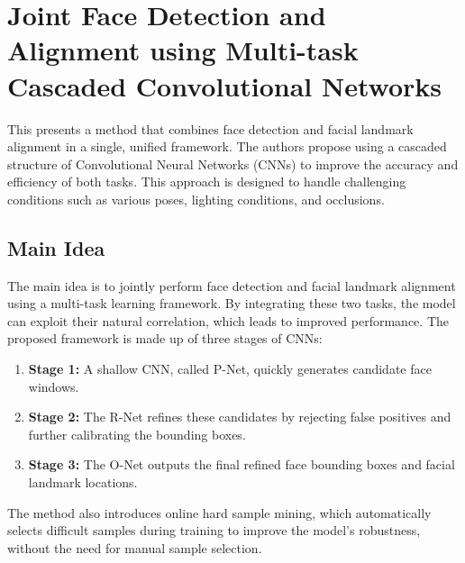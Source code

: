 \documentclass{report}
\begin{document}
	
	
	
	
	
	
	
	
	
	
	
	
	\chapter{Joint Face Detection and Alignment using Multi-task Cascaded Convolutional Networks \cite{Zhang_2016}}
	This presents a method that combines face detection and facial landmark alignment in a single, unified framework. The authors propose using a cascaded structure of Convolutional Neural Networks (CNNs) to improve the accuracy and efficiency of both tasks. This approach is designed to handle challenging conditions such as various poses, lighting conditions, and occlusions.
	
	
	\section{Main Idea}
	The main idea is to jointly perform face detection and facial landmark alignment using a multi-task learning framework. By integrating these two tasks, the model can exploit their natural correlation, which leads to improved performance. The proposed framework is made up of three stages of CNNs:
	\begin{enumerate}
		\item 
		\textbf{Stage 1:} A shallow CNN, called P-Net, quickly generates candidate face windows.
		
		\item 
		\textbf{Stage 2:} The R-Net refines these candidates by rejecting false positives and further calibrating the bounding boxes.
		
		\item 
		\textbf{Stage 3:} The O-Net outputs the final refined face bounding boxes and facial landmark locations.
	\end{enumerate}
	The method also introduces online hard sample mining, which automatically selects difficult samples during training to improve the model's robustness, without the need for manual sample selection.
	
\end{document}

